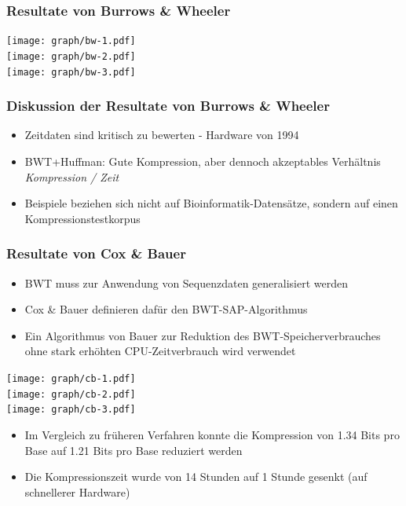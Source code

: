 \documentclass[14pt,xcolor=dvipsnames,pdftex]{beamer}
\begin{document}
\begin{frame}[allowframebreaks]
 \frametitle{Resultate von Burrows \& Wheeler}
 \texttt{[image: graph/bw-1.pdf]}
 \framebreak\\
 \texttt{[image: graph/bw-2.pdf]}
 \framebreak\\
 \texttt{[image: graph/bw-3.pdf]}
\end{frame}
\begin{frame}
 \frametitle{Diskussion der Resultate von Burrows \& Wheeler}
 \begin{itemize}
  \item Zeitdaten sind kritisch zu bewerten - Hardware von 1994
  \item BWT+Huffman: Gute Kompression, aber dennoch akzeptables Verhältnis \textit{Kompression / Zeit}
  \item Beispiele beziehen sich nicht auf Bioinformatik-Datensätze, sondern auf einen Kompressionstestkorpus
 \end{itemize}
\end{frame}
\begin{frame}[allowframebreaks]
 \frametitle{Resultate von Cox \& Bauer}
 \begin{itemize}
  \item BWT muss zur Anwendung von Sequenzdaten generalisiert werden
  \item Cox \& Bauer definieren dafür den BWT-SAP-Algorithmus
  \item Ein Algorithmus von Bauer zur Reduktion des BWT-Speicherverbrauches ohne stark erhöhten CPU-Zeitverbrauch wird verwendet
 \end{itemize}
 \framebreak
 \texttt{[image: graph/cb-1.pdf]}
 \framebreak\\
 \texttt{[image: graph/cb-2.pdf]}
 \framebreak\\
 \texttt{[image: graph/cb-3.pdf]}
 \framebreak
 \begin{itemize}
  \item Im Vergleich zu früheren Verfahren konnte die Kompression von 1.34 Bits pro Base auf 1.21 Bits pro Base reduziert werden
  \item Die Kompressionszeit wurde von 14 Stunden auf 1 Stunde gesenkt (auf schnellerer Hardware)
 \end{itemize}
\end{frame}
\end{document}

